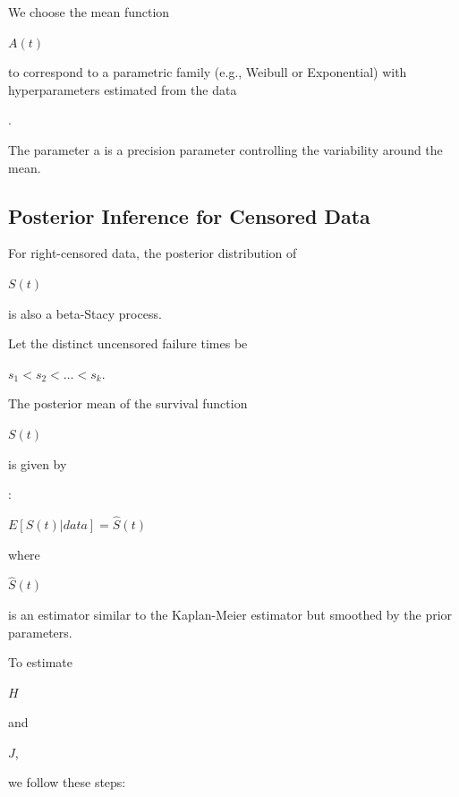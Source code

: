 \documentclass[10pt,twoside]{article}
\numberwithin{equation}{section}
\begin{document}
We choose the mean function 

$A(t)$ 

to correspond to a parametric family (e.g., Weibull or Exponential) with hyperparameters estimated from the data 

\citep{8}. 

The parameter a is a precision parameter controlling the variability around the mean. 



\subsection{Posterior Inference for Censored Data}

For right-censored data, the posterior distribution of 

$S(t)$

is also a beta-Stacy process. 

Let the distinct uncensored failure times be 

$s_1 < s_2 < \ldots < s_k$. 

The posterior mean of the survival function 

$S(t)$ 

is given by 

\citep{3,6}:

$E[S(t) | data] = \hat{S}(t)$

where 

$\hat{S}(t)$ 

is an estimator similar to the Kaplan-Meier estimator but smoothed by the prior parameters. 


To estimate 

$H$ 

and 

$J$, 

we follow these steps: 
\end{document}
